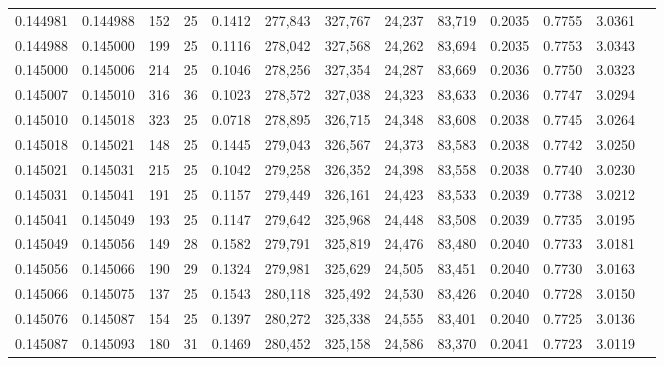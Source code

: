 \begin{tabular}{rrrrrrrrrrrrr}
0.144981 & 0.144988 & 152 &  25 &                                     0.1412 & 277,843 & 327,767 &  24,237 &  83,719 & 0.2035 & 0.7755 & 3.0361 \\
0.144988 & 0.145000 & 199 &  25 &                                     0.1116 & 278,042 & 327,568 &  24,262 &  83,694 & 0.2035 & 0.7753 & 3.0343 \\
0.145000 & 0.145006 & 214 &  25 &                                     0.1046 & 278,256 & 327,354 &  24,287 &  83,669 & 0.2036 & 0.7750 & 3.0323 \\
0.145007 & 0.145010 & 316 &  36 &                                     0.1023 & 278,572 & 327,038 &  24,323 &  83,633 & 0.2036 & 0.7747 & 3.0294 \\
0.145010 & 0.145018 & 323 &  25 &                                     0.0718 & 278,895 & 326,715 &  24,348 &  83,608 & 0.2038 & 0.7745 & 3.0264 \\
0.145018 & 0.145021 & 148 &  25 &                                     0.1445 & 279,043 & 326,567 &  24,373 &  83,583 & 0.2038 & 0.7742 & 3.0250 \\
0.145021 & 0.145031 & 215 &  25 &                                     0.1042 & 279,258 & 326,352 &  24,398 &  83,558 & 0.2038 & 0.7740 & 3.0230 \\
0.145031 & 0.145041 & 191 &  25 &                                     0.1157 & 279,449 & 326,161 &  24,423 &  83,533 & 0.2039 & 0.7738 & 3.0212 \\
0.145041 & 0.145049 & 193 &  25 &                                     0.1147 & 279,642 & 325,968 &  24,448 &  83,508 & 0.2039 & 0.7735 & 3.0195 \\
0.145049 & 0.145056 & 149 &  28 &                                     0.1582 & 279,791 & 325,819 &  24,476 &  83,480 & 0.2040 & 0.7733 & 3.0181 \\
0.145056 & 0.145066 & 190 &  29 &                                     0.1324 & 279,981 & 325,629 &  24,505 &  83,451 & 0.2040 & 0.7730 & 3.0163 \\
0.145066 & 0.145075 & 137 &  25 &                                     0.1543 & 280,118 & 325,492 &  24,530 &  83,426 & 0.2040 & 0.7728 & 3.0150 \\
0.145076 & 0.145087 & 154 &  25 &                                     0.1397 & 280,272 & 325,338 &  24,555 &  83,401 & 0.2040 & 0.7725 & 3.0136 \\
0.145087 & 0.145093 & 180 &  31 &                                     0.1469 & 280,452 & 325,158 &  24,586 &  83,370 & 0.2041 & 0.7723 & 3.0119 \\

\end{tabular}
